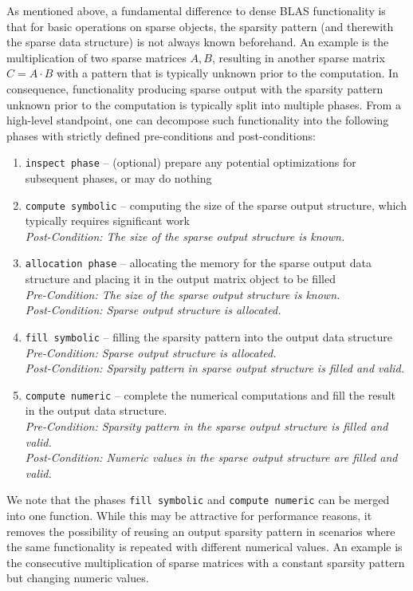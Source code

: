 \documentclass{article}
\begin{document}
As mentioned above, a fundamental difference to dense BLAS functionality is that for basic operations on sparse objects, the sparsity pattern (and therewith the sparse data structure) is not always known beforehand. An example is the multiplication of two sparse matrices $A, B$, resulting in another sparse matrix $C = A\cdot B$ with a pattern that is typically unknown prior to the computation. In consequence, functionality producing sparse output with the sparsity pattern unknown prior to the computation is typically split into multiple phases. From a high-level standpoint, one can decompose such functionality into the following phases with strictly defined pre-conditions and post-conditions:

\begin{enumerate}
    \item \texttt{inspect phase} -- (optional) prepare any potential optimizations for subsequent phases, or may do nothing
    \item \texttt{compute symbolic} -- computing the size of the sparse output structure, which typically requires significant work\\
    \textit{Post-Condition: The size of the sparse output structure is known.}
    \item \texttt{allocation phase} -- allocating the memory for the sparse output data structure and placing it in the output matrix object to be filled\\
    \textit{Pre-Condition: The size of the sparse output structure is known.}\\
    \textit{Post-Condition: Sparse output structure is allocated.}
    \item \texttt{fill symbolic} -- filling the sparsity pattern into the output data structure
    \textit{Pre-Condition: Sparse output structure is allocated.}\\
    \textit{Post-Condition: Sparsity pattern in sparse output structure is filled and valid.}
    \item \texttt{compute numeric} -- complete the numerical computations and fill the result in the output data structure.\\
    \textit{Pre-Condition: Sparsity pattern in the sparse output structure is filled and valid.\\
    Post-Condition: Numeric values in the sparse output structure are filled and valid.}
\end{enumerate}

We note that the phases \texttt{fill symbolic} and \texttt{compute numeric} can be merged into one function. While this may be attractive for performance reasons, it removes the possibility of reusing an output sparsity pattern in scenarios where the same functionality is repeated with different numerical values. An example is the consecutive multiplication of sparse matrices with a constant sparsity pattern but changing numeric values.
\end{document}
